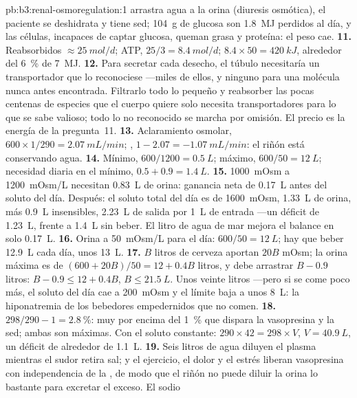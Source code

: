 \begin{solution}{pb:b3:renal-osmoregulation:1}
arrastra agua a la orina (diuresis osmótica), el paciente se deshidrata
y tiene sed; \qty{104}{g} de glucosa son \qty{1.8}{MJ} perdidos al día,
y las células, incapaces de captar glucosa, queman grasa y proteína: el
peso cae.
\textbf{11.} Reabsorbidos $\approx \qty{25}{mol/d}$; ATP, $25/3 =
\qty{8.4}{mol/d}$; $8.4\times 50 = \qty{420}{kJ}$, alrededor del
\qty{6}{\%} de \qty{7}{MJ}.
\textbf{12.} Para secretar cada desecho, el túbulo necesitaría un
transportador que lo reconociese ---miles de ellos, y ninguno para una
molécula nunca antes encontrada. Filtrarlo todo lo pequeño y reabsorber
las pocas centenas de especies que el cuerpo quiere solo necesita
transportadores para lo que se sabe valioso; todo lo no reconocido se
marcha por omisión. El precio es la energía de la pregunta~11.
\textbf{13.} Aclaramiento osmolar, $600\times 1/290 = \qty{2.07}{mL/min}$;
, $1 - 2.07 = -\qty{1.07}{mL/min}$: el riñón
está conservando agua.
\textbf{14.} Mínimo, $600/1200 = \qty{0.5}{L}$; máximo, $600/50 =
\qty{12}{L}$; necesidad diaria en el mínimo, $0.5 + 0.9 = \qty{1.4}{L}$.
\textbf{15.} \qty{1000}{mOsm} a \qty{1200}{mOsm/L} necesitan
\qty{0.83}{L} de orina: ganancia neta de \qty{0.17}{L} antes del soluto
del día. Después: el soluto total del día es de \qty{1600}{mOsm},
\qty{1.33}{L} de orina, más \qty{0.9}{L} insensibles, \qty{2.23}{L} de
salida por \qty{1}{L} de entrada ---un déficit de \qty{1.23}{L}, frente
a \qty{1.4}{L} sin beber. El litro de agua de mar mejora el balance en
solo \qty{0.17}{L}.
\textbf{16.} Orina a \qty{50}{mOsm/L} para el día: $600/50 =
\qty{12}{L}$; hay que beber \qty{12.9}{L} cada día, unos \qty{13}{L}.
\textbf{17.} $B$ litros de cerveza aportan $20B$ mOsm; la orina máxima
es de $(600 + 20B)/50 = 12 + 0.4B$ litros, y debe arrastrar $B - 0.9$
litros: $B - 0.9 \le 12 + 0.4B$, $B \le \qty{21.5}{L}$. Unos veinte
litros ---pero si se come poco más, el soluto del día cae a
\qty{200}{mOsm} y el límite baja a unos \qty{8}{L}: la hiponatremia de
los bebedores empedernidos que no comen.
\textbf{18.} $298/290 - 1 = \qty{2.8}{\%}$: muy por encima del \qty{1}{\%}
que dispara la vasopresina y la sed; ambas son máximas. Con el soluto
constante: $290\times 42 = 298\times V$, $V = \qty{40.9}{L}$, un
déficit de alrededor de \qty{1.1}{L}.
\textbf{19.} Seis litros de agua diluyen el plasma mientras el sudor
retira sal; y el ejercicio, el dolor y el estrés liberan vasopresina
con independencia de la , de modo que el riñón no puede
diluir la orina lo bastante para excretar el exceso. El sodio

\end{solution}
